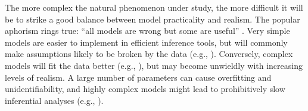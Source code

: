 \documentclass[oneside]{article}
\begin{document}
The more complex the natural phenomenon under study,
the more difficult it will be to strike a good balance
between model practicality and realism.
The popular aphorism rings true: ``all models are wrong but some are useful''
\citep{box79}.
Very simple models are easier to implement in efficient inference tools, but will
commonly make assumptions likely to be broken by the data (e.g.,
\citealp{sullivan97,mendes17,mendes19}).
Conversely, complex models will fit the data better (e.g., \citealp{ogilvie22}), but
may become unwieldly with increasing levels of realism.
A large number of parameters can cause overfitting and unidentifiability,
and highly complex models might lead to prohibitively slow inferential analyses
(e.g., \citealp{lartillot11}).
\end{document}

